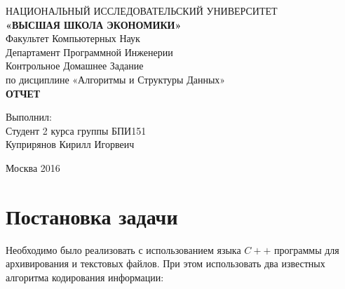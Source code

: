 \documentclass[russian, a4paper, 12pt]{article}
\begin{document}
\begingroup
    \fontsize{14pt}{14pt}\selectfont
\begin{center}
\hfill \break
\footnotesize{НАЦИОНАЛЬНЫЙ ИССЛЕДОВАТЕЛЬСКИЙ УНИВЕРСИТЕТ}\\
\small{\textbf{«ВЫСШАЯ ШКОЛА ЭКОНОМИКИ»}}\\
\hfill \break
\normalsize{Факультет Компьютерных Наук}\\
 \hfill \break
\normalsize{Департамент Программной Инженерии}\\
\hfill\break
\hfill \break
\hfill \break
\hfill \break
\hfill \break
\hfill \break
\hfill \break
\hfill \break
\normalsize{Контрольное Домашнее Задание\\
\hfill \break
по дисциплине «Алгоритмы и Структуры Данных»\\
\hfill \break
\textbf{ОТЧЕТ}}\\
\hfill \break
\hfill \break
\end{center}

\hfill \break
\hfill \break
\hfill \break
\hfill \break
\begin{flushright}
  \normalsize{Выполнил:}\\
  \normalsize{Студент 2 курса группы БПИ151}\\
  \normalsize{Куприрянов Кирилл Игорвеич}
\end{flushright}
\hfill \break
\hfill \break
\hfill \break
\hfill \break
\hfill \break
\hfill \break
\hfill \break
\hfill \break
\hfill \break
\hfill \break
\hfill \break
\hfill \break
\hfill \break
\hfill \break
\hfill \break
\begin{center} Москва 2016 \end{center}
\thispagestyle{empty} %

\endgroup

\newpage
    \tableofcontents %
\newpage

\newpage
\section{Постановка задачи}
Необходимо было реализовать с использованием языка $C++$ программы для
архивирования и текстовых файлов. При этом использовать два известных алгоритма
кодирования информации:
\end{document}
